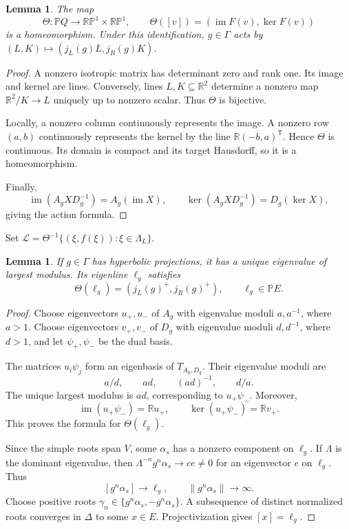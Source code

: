 \documentclass[11pt,reqno]{amsart}
\newcommand{\R}{\mathbb{R}}
\theoremstyle{plain}
\newtheorem{lemma}[theorem]{Lemma}
\theoremstyle{definition}
\theoremstyle{remark}
\numberwithin{equation}{section}
\begin{document}
\begin{lemma}\label{lem:theta}
The map
\[
\Theta:\mathbb P Q\longrightarrow\mathbb{RP}^1\times\mathbb{RP}^1,
\qquad\Theta([v])=(\operatorname{im}F(v),\ker F(v))
\]
is a homeomorphism. Under this identification, $g\in\Gamma$ acts by $(L,K)\mapsto(j_L(g)L,j_R(g)K)$.
\end{lemma}
\begin{proof}
A nonzero isotropic matrix has determinant zero and rank one. Its image and kernel are lines. Conversely, lines $L,K\subseteq\R^2$ determine a nonzero map $\R^2/K\to L$ uniquely up to nonzero scalar. Thus $\Theta$ is bijective.

Locally, a nonzero column continuously represents the image. A nonzero row $(a,b)$ continuously represents the kernel by the line $\R(-b,a)^{\mathsf T}$. Hence $\Theta$ is continuous. Its domain is compact and its target Hausdorff, so it is a homeomorphism.

Finally,
\[
\operatorname{im}(A_gXD_g^{-1})=A_g(\operatorname{im}X),\qquad
\ker(A_gXD_g^{-1})=D_g(\ker X),
\]
giving the action formula.
\end{proof}

Set $\mathcal L=\Theta^{-1}\{(\xi,f(\xi)):\xi\in\Lambda_L\}$.

\begin{lemma}\label{lem:attracting-root}
If $g\in\Gamma$ has hyperbolic projections, it has a unique eigenvalue of largest modulus. Its eigenline $\ell_g$ satisfies
\[
\Theta(\ell_g)=(j_L(g)^+,j_R(g)^+),\qquad\ell_g\in\mathbb P E.
\]
\end{lemma}
\begin{proof}
Choose eigenvectors $u_+,u_-$ of $A_g$ with eigenvalue moduli $a,a^{-1}$, where $a>1$. Choose eigenvectors $v_+,v_-$ of $D_g$ with eigenvalue moduli $d,d^{-1}$, where $d>1$, and let $\psi_+,\psi_-$ be the dual basis.

The matrices $u_i\psi_j$ form an eigenbasis of $T_{A_g,D_g}$. Their eigenvalue moduli are
\[
a/d,\qquad ad,\qquad(ad)^{-1},\qquad d/a.
\]
The unique largest modulus is $ad$, corresponding to $u_+\psi_-$. Moreover,
\[
\operatorname{im}(u_+\psi_-)=\R u_+,\qquad\ker(u_+\psi_-)=\R v_+.
\]
This proves the formula for $\Theta(\ell_g)$.

Since the simple roots span $V$, some $\alpha_s$ has a nonzero component on $\ell_g$. If $\Lambda$ is the dominant eigenvalue, then $\Lambda^{-n}g^n\alpha_s\to ce\neq0$ for an eigenvector $e$ on $\ell_g$. Thus
\[
[g^n\alpha_s]\longrightarrow\ell_g,\qquad\|g^n\alpha_s\|\longrightarrow\infty.
\]
Choose positive roots $\gamma_n\in\{g^n\alpha_s,-g^n\alpha_s\}$. A subsequence of distinct normalized roots converges in $\Delta$ to some $x\in E$. Projectivization gives $[x]=\ell_g$.
\end{proof}
\end{document}
